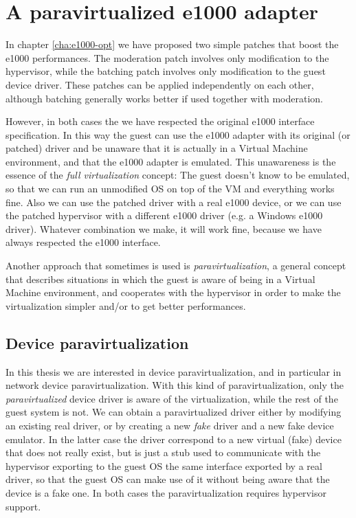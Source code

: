 \chapter{A paravirtualized e1000 adapter}
\label{cha:paravirt}
In chapter \ref{cha:e1000-opt} we have proposed two simple patches that boost the e1000 performances.
The moderation patch involves only modification to the hypervisor, while the batching patch involves only modification to the
guest device driver. These patches can be applied independently on each other, although batching generally works better if
used together with moderation.

\vspace{0.5cm}

However, in both cases the we have respected the original e1000 interface specification. In this way the guest can use the e1000 adapter
with its original (or patched) driver and be unaware that it is actually in a Virtual Machine environment, and that the e1000 adapter is
emulated.  This unawareness is the essence of the \emph{full virtualization} concept: The guest doesn't know to be emulated, so
that we can run an unmodified OS on top of the VM and everything works fine.
Also we can use the patched driver with a real e1000 device, or we can use the patched hypervisor with a different e1000 
driver (e.g. a Windows e1000 driver). Whatever combination we make, it will work fine, because we have always respected the e1000 interface.

\vspace{0.5cm}

Another approach that sometimes is used is \emph{paravirtualization}, a general concept that describes situations in which the 
guest is aware of being in a Virtual Machine environment, and cooperates with the hypervisor in order to make the virtualization simpler
and/or to get better performances.


\section{Device paravirtualization}
In this thesis we are interested in device paravirtualization, and in particular in network device paravirtualization.
With this kind of paravirtualization, only the \emph{paravirtualized} device driver is aware of the virtualization, while the rest of the
guest system is not.
We can obtain a paravirtualized driver either by modifying an existing real driver, or by creating a new \emph{fake} driver and a new
fake device emulator. In the latter case the driver correspond to a new virtual (fake) device that does not really exist, but is
just a stub used to communicate with the hypervisor exporting to the guest OS the same interface exported by a real driver, so that the
guest OS can make use of it without being aware that the device is a fake one. In both cases the paravirtualization requires hypervisor 
support.

